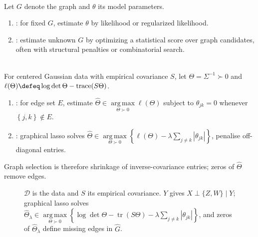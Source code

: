 \begin{remark} \label{rem:sl-graphical-learning} \\
Let $G$ denote the graph and $\theta$ its model parameters.
\begin{enumerate}[label=(\roman*)]
\setlength{\itemsep}{0pt}
\item {}: for fixed $G$, estimate $\theta$ by likelihood or regularized likelihood.
\item {}: estimate unknown $G$ by optimizing a statistical score over graph candidates, often with structural penalties or combinatorial search.
\end{enumerate}
\end{remark}

\begin{method} \label{meth:sl-gaussian-graphical-model-learning} \\
For centered Gaussian data with empirical covariance $S$, let $\Theta=\Sigma^{-1}\succ0$ and $\ell(\Theta)\defeq\log\det\Theta-\operatorname{trace}(S\Theta)$.
\begin{enumerate}[label=(\roman*)]
\setlength{\itemsep}{0pt}
\item {}: for edge set $E$, estimate $\widehat{\Theta}\in\operatorname*{arg\,max}\limits_{\Theta\succ0}\ell(\Theta)$ subject to $\theta_{jk}=0$ whenever $\left\{j,k\right\}\notin E$.
\item {}: graphical lasso solves $\widehat{\Theta}\in\operatorname*{arg\,max}\limits_{\Theta\succ0}\left\{\ell(\Theta)-\lambda\sum\limits_{j\neq k}|\theta_{jk}|\right\}$, penalise off-diagonal entries.
\end{enumerate}
Graph selection is therefore shrinkage of inverse-covariance entries; zeros of $\widehat{\Theta}$ remove edges.
\end{method}

\begin{figure}[H]
\centering

\caption{$\mathcal D$ is the data and $S$ its empirical covariance. \textcolor{orange!70!black}{$Y$} gives $X\perp\{Z,W\}\mid Y$; graphical lasso solves $\widehat{\Theta}_\lambda\in\operatorname*{arg\,max}\limits_{\Theta\succ0}\left\{\log\det\Theta-\operatorname{tr}(S\Theta)-\lambda\sum_{j\ne k}|\theta_{jk}|\right\}$, and zeros of $\widehat{\Theta}_\lambda$ define missing edges in $\widehat G$.}
\label{fig:sl-markov-graph-separation-learning}
\end{figure}

